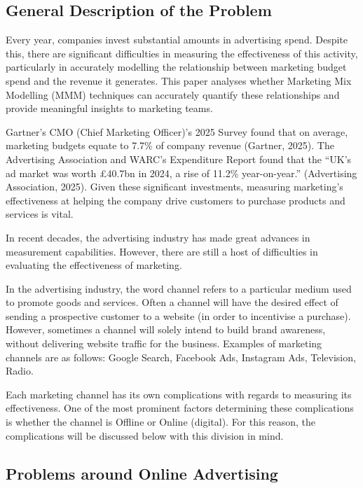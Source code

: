 \documentclass[11pt, a4paper]{article}
\begin{document}
\subsection{General Description of the Problem
}
Every year, companies invest substantial amounts in advertising spend. Despite this, there are significant difficulties in measuring the effectiveness of this activity, particularly in accurately modelling the relationship between marketing budget spend and the revenue it generates. This paper analyses whether Marketing Mix Modelling (MMM) techniques can accurately quantify these relationships and provide meaningful insights to marketing teams.

Gartner’s CMO (Chief Marketing Officer)’s 2025 Survey found that on average, marketing budgets equate to 7.7\% of company revenue (Gartner, 2025). The Advertising Association and WARC’s Expenditure Report found that the “UK’s ad market was worth £40.7bn in 2024, a rise of 11.2\% year-on-year.” (Advertising Association, 2025). Given these significant investments, measuring marketing’s effectiveness at helping the company drive customers to purchase products and services is vital. 

In recent decades, the advertising industry has made great advances in measurement capabilities. However, there are still a host of difficulties in evaluating the effectiveness of marketing. 

In the advertising industry, the word channel refers to a particular medium used to promote goods and services. Often a channel will have the desired effect of sending a prospective customer to a website (in order to incentivise a purchase). However, sometimes a channel will solely intend to build brand awareness, without delivering website traffic for the business. Examples of marketing channels are as follows: Google Search, Facebook Ads, Instagram Ads, Television, Radio. 

Each marketing channel has its own complications with regards to measuring its effectiveness. One of the most prominent factors determining these complications is whether the channel is Offline or Online (digital). For this reason, the complications will be discussed below with this division in mind. 


\subsection{
Problems around Online Advertising}
\end{document}
